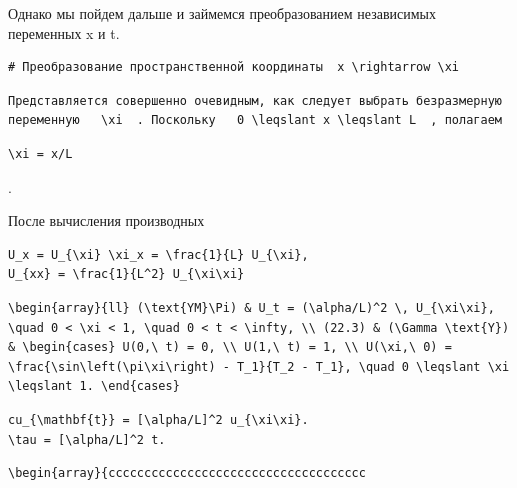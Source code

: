 \documentclass[
  ukrainian,
]{article}
\begin{document}
Однако мы пойдем дальше и займемся преобразованием независимых
переменных x и t.

\begin{verbatim}
# Преобразование пространственной координаты  x \rightarrow \xi
\end{verbatim}

\begin{verbatim}
Представляется совершенно очевидным, как следует выбрать безразмерную переменную   \xi  . Поскольку   0 \leqslant x \leqslant L  , полагаем
\end{verbatim}

\begin{verbatim}
\xi = x/L
\end{verbatim}

.

После вычисления производных

\begin{verbatim}
U_x = U_{\xi} \xi_x = \frac{1}{L} U_{\xi},
U_{xx} = \frac{1}{L^2} U_{\xi\xi}
\end{verbatim}

\begin{verbatim}
\begin{array}{ll} (\text{YM}\Pi) & U_t = (\alpha/L)^2 \, U_{\xi\xi}, \quad 0 < \xi < 1, \quad 0 < t < \infty, \\ (22.3) & (\Gamma \text{Y}) & \begin{cases} U(0,\ t) = 0, \\ U(1,\ t) = 1, \\ U(\xi,\ 0) = \frac{\sin\left(\pi\xi\right) - T_1}{T_2 - T_1}, \quad 0 \leqslant \xi \leqslant 1. \end{cases}
\end{verbatim}

\begin{verbatim}
cu_{\mathbf{t}} = [\alpha/L]^2 u_{\xi\xi}.
\tau = [\alpha/L]^2 t.
\end{verbatim}

\begin{verbatim}
\begin{array}{cccccccccccccccccccccccccccccccccccc
\end{verbatim}
\end{document}
